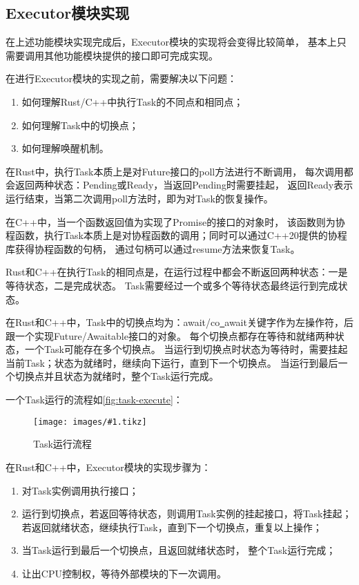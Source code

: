 \documentclass[supercite]{HustGraduPaper}
\newcommand{\cfig}[3]{
  \begin{figure}[htb]
    \centering
    \texttt{[image: images/\#1.tikz]}
    \caption{#3}
    \label{fig:#1}
  \end{figure}
}
\newcommand{\rfig}[1]{\autoref{fig:#1}}
\theoremstyle{definition}
\begin{document}
\subsection{Executor模块实现}
在上述功能模块实现完成后，Executor模块的实现将会变得比较简单，
基本上只需要调用其他功能模块提供的接口即可完成实现。\par

在进行Executor模块的实现之前，需要解决以下问题：
\begin{enumerate}[label={(\arabic*)}]
  \item 如何理解Rust/C++中执行Task的不同点和相同点；
  \item 如何理解Task中的切换点；
  \item 如何理解唤醒机制。
\end{enumerate}

在Rust中，执行Task本质上是对Future接口的poll方法进行不断调用，
每次调用都会返回两种状态：Pending或Ready，当返回Pending时需要挂起，
返回Ready表示运行结束，当第二次调用poll方法时，即为对Task的恢复操作。\par

在C++中，当一个函数返回值为实现了Promise的接口的对象时，
该函数则为协程函数，执行Task本质上是对协程函数的调用；同时可以通过C++20提供的协程库获得协程函数的句柄，
通过句柄可以通过resume方法来恢复Task。

Rust和C++在执行Task的相同点是，在运行过程中都会不断返回两种状态：一是等待状态，二是完成状态。
Task需要经过一个或多个等待状态最终运行到完成状态。\par

在Rust和C++中，Task中的切换点均为：await/co\underline{~}await关键字作为左操作符，后跟一个实现Future/Awaitable接口的对象。
每个切换点都存在等待和就绪两种状态，一个Task可能存在多个切换点。
当运行到切换点时状态为等待时，需要挂起当前Task；状态为就绪时，继续向下运行，直到下一个切换点。
当运行到最后一个切换点并且状态为就绪时，整个Task运行完成。\par

一个Task运行的流程如\rfig{task-execute}：

\cfig{task-execute}{1.0}{Task运行流程}

在Rust和C++中，Executor模块的实现步骤为：

\begin{enumerate}[label={(\arabic*)}]
  \item 对Task实例调用执行接口；
  \item 运行到切换点，若返回等待状态，则调用Task实例的挂起接口，将Task挂起；
    若返回就绪状态，继续执行Task，直到下一个切换点，重复以上操作；
  \item 当Task运行到最后一个切换点，且返回就绪状态时，
    整个Task运行完成；
  \item 让出CPU控制权，等待外部模块的下一次调用。
\end{enumerate}
\end{document}
